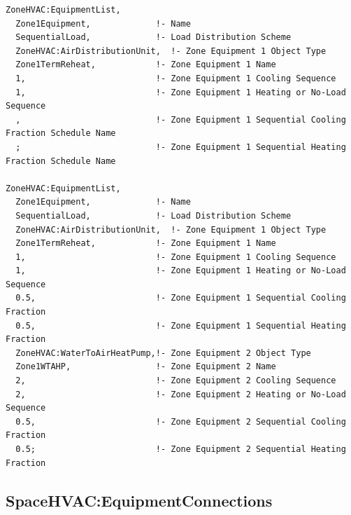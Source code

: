 \begin{lstlisting}
ZoneHVAC:EquipmentList,
  Zone1Equipment,             !- Name
  SequentialLoad,             !- Load Distribution Scheme
  ZoneHVAC:AirDistributionUnit,  !- Zone Equipment 1 Object Type
  Zone1TermReheat,            !- Zone Equipment 1 Name
  1,                          !- Zone Equipment 1 Cooling Sequence
  1,                          !- Zone Equipment 1 Heating or No-Load Sequence
  ,                           !- Zone Equipment 1 Sequential Cooling Fraction Schedule Name
  ;                           !- Zone Equipment 1 Sequential Heating Fraction Schedule Name

ZoneHVAC:EquipmentList,
  Zone1Equipment,             !- Name
  SequentialLoad,             !- Load Distribution Scheme
  ZoneHVAC:AirDistributionUnit,  !- Zone Equipment 1 Object Type
  Zone1TermReheat,            !- Zone Equipment 1 Name
  1,                          !- Zone Equipment 1 Cooling Sequence
  1,                          !- Zone Equipment 1 Heating or No-Load Sequence
  0.5,                        !- Zone Equipment 1 Sequential Cooling Fraction
  0.5,                        !- Zone Equipment 1 Sequential Heating Fraction
  ZoneHVAC:WaterToAirHeatPump,!- Zone Equipment 2 Object Type
  Zone1WTAHP,                 !- Zone Equipment 2 Name
  2,                          !- Zone Equipment 2 Cooling Sequence
  2,                          !- Zone Equipment 2 Heating or No-Load Sequence
  0.5,                        !- Zone Equipment 2 Sequential Cooling Fraction
  0.5;                        !- Zone Equipment 2 Sequential Heating Fraction
\end{lstlisting}

\subsection{SpaceHVAC:EquipmentConnections}\label{spacehvacequipmentconnections}

